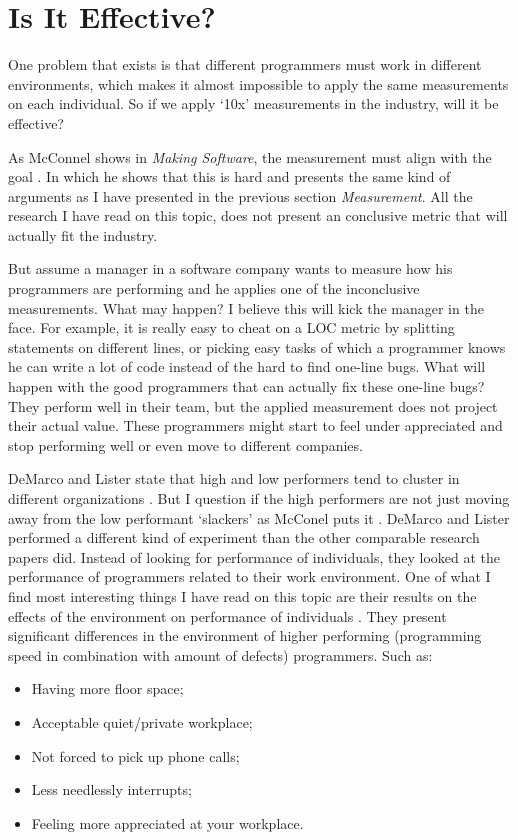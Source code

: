 \section*{Is It Effective?}

One problem that exists is that different programmers must work in different environments,
which makes it almost impossible to apply the same measurements on each individual.
So if we apply `10x' measurements in the industry, will it be effective?

As McConnel shows in \textit{Making Software}, the measurement must align with the goal \autocite[570-571]{MAKING_SOFTWARE}.
In which he shows that this is hard and presents the same kind of arguments as I have presented in the previous section \textit{Measurement}.
All the research I have read on this topic, does not present an conclusive metric that will actually fit the industry.

But assume a manager in a software company wants to measure how his programmers are performing and he applies one of the inconclusive measurements.
What may happen? I believe this will kick the manager in the face.
For example, it is really easy to cheat on a LOC metric by splitting statements on different lines, or picking easy tasks of which a programmer knows he can write a lot of code instead of the hard to find one-line bugs.
What will happen with the good programmers that can actually fix these one-line bugs?
They perform well in their team, but the applied measurement does not project their actual value.
These programmers might start to feel under appreciated and stop performing well or even move to different companies.

DeMarco and Lister state that high and low performers tend to cluster in different organizations \autocite[268]{demarco1985programmer}.
But I question if the high performers are not just moving away from the low performant `slackers' as McConel puts it \autocite[569]{MAKING_SOFTWARE}.
DeMarco and Lister performed a different kind of experiment than the other comparable research papers did.
Instead of looking for performance of individuals, they looked at the performance of programmers related to their work environment.
One of what I find most interesting things I have read on this topic are their results on the effects of the environment on performance of individuals \autocite[271]{demarco1985programmer}.
They present significant differences in the environment of higher performing (programming speed in combination with amount of defects) programmers. Such as:
\begin{itemize}[noitemsep]
\item Having more floor space;
\item Acceptable quiet/private workplace;
\item Not forced to pick up phone calls;
\item Less needlessly interrupts;
\item Feeling more appreciated at your workplace.
\end{itemize}

